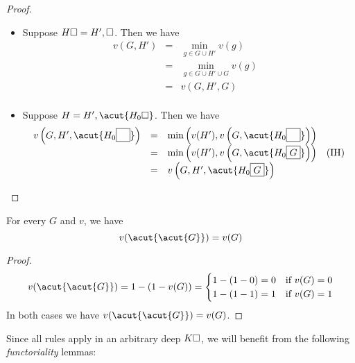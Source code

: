 \begin{scope}
\begin{scope}
\begin{proof}
  \def\arraystretch{1.5}
  \begin{itemize}
    \item[\bcase]
      Suppose $H\square = H', \square$. Then we have
      $$
      \begin{array}{rcll}
        v(G, H')
        &=& \min_{g \in G \cup H'}{v(g)} & \\
        &=& \min_{g \in G \cup H' \cup G}{v(g)} & \\
        &=& v(G, H', G) & \\
      \end{array}
      $$
    \item[\rcase]
      Suppose $H = H', \acut{H_0\hole}$. Then we have
      $$
      \begin{array}{rcll}
        v\left(G, H', \acut{H_0\select{\phantom{G}}}\right)
        &=& \min\left(v(H'), v\left(G, \acut{H_0\select{\phantom{G}}}\right)\right) & \\
        &=& \min\left(v(H'), v\left(G, \acut{H_0\select{G}}\right)\right) &\text{(IH)} \\
        &=& v\left(G, H', \acut{H_0\select{G}}\right) & \\
      \end{array}
      $$
  \end{itemize}
\end{proof}

\begin{lemma}
  For every  $G$ and  $v$, we have
  $$v(\acut{\acut{G}}) = v(G)$$
\end{lemma}
\begin{proof}
  $$
  v(\acut{\acut{G}}) = 1 - (1 - v(G)) = \begin{cases}
    1 - (1 - 0) = 0 &\text{if $v(G) = 0$} \\
    1 - (1 - 1) = 1 &\text{if $v(G) = 1$}
  \end{cases}
  $$
  In both cases we have $v(\acut{\acut{G}}) = v(G)$.
\end{proof}

Since all rules apply in an arbitrary deep  $K\square$, we will benefit
from the following \emph{functoriality} lemmas:



\end{scope}
\end{scope}
